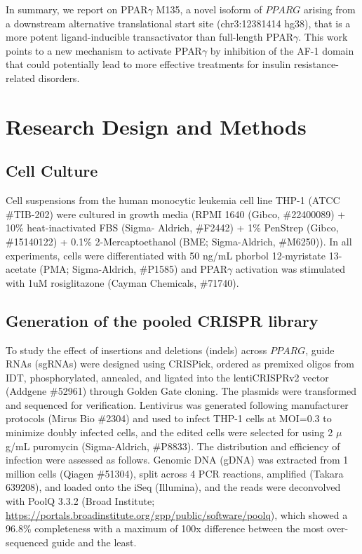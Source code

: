 In summary, we report on PPAR$\gamma$ M135, a novel isoform of \(PPARG\) arising from a downstream alternative translational start site (chr3:12381414 hg38), that is a more potent ligand-inducible transactivator than full-length PPAR$\gamma$. This work points to a new mechanism to activate PPAR$\gamma$ by inhibition of the AF-1 domain that could potentially lead to more effective treatments for insulin resistance-related disorders.

\section{Research Design and Methods}

\subsection{Cell Culture}
Cell suspensions from the human monocytic leukemia cell line THP-1 (ATCC \#TIB-202) were cultured in growth media (RPMI 1640 (Gibco, \#22400089) + 10\% heat-inactivated FBS (Sigma- Aldrich, \#F2442) + 1\% PenStrep (Gibco, \#15140122) + 0.1\% 2-Mercaptoethanol (BME; Sigma-Aldrich, \#M6250)). In all experiments, cells were differentiated with 50 ng/mL phorbol 12-myristate 13-acetate (PMA; Sigma-Aldrich, \#P1585) and PPAR$\gamma$ activation was stimulated with 1uM rosiglitazone (Cayman Chemicals, \#71740).

\subsection{Generation of the pooled CRISPR library}
To study the effect of insertions and deletions (indels) across \(PPARG\), guide RNAs (sgRNAs) were designed using CRISPick\cite{Doench2016-za}, ordered as premixed oligos from IDT, phosphorylated, annealed, and ligated into the lentiCRISPRv2 vector (Addgene \#52961) through Golden Gate cloning\cite{Engler2008-in}. The plasmids were transformed and sequenced for verification. Lentivirus was generated following manufacturer protocols (Mirus Bio \#2304) and used to infect THP-1 cells at MOI=0.3 to minimize doubly infected cells, and the edited cells were selected for using 2 $\mu$g/mL puromycin (Sigma-Aldrich, \#P8833). The distribution and efficiency of infection were assessed as follows. Genomic DNA (gDNA) was extracted from 1 million cells (Qiagen \#51304), split across 4 PCR reactions, amplified (Takara 639208), and loaded onto the iSeq (Illumina), and the reads were deconvolved with PoolQ 3.3.2 (Broad Institute; \url{https://portals.broadinstitute.org/gpp/public/software/poolq}), which showed a 96.8\% completeness with a maximum of 100x difference between the most over-sequenced guide and the least.

